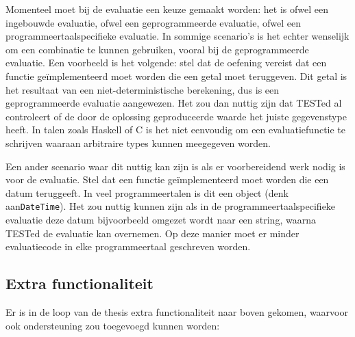 Momenteel moet bij de evaluatie een keuze gemaakt worden: het is ofwel een ingebouwde evaluatie, ofwel een geprogrammeerde evaluatie, ofwel een programmeertaalspecifieke evaluatie.
In sommige scenario's is het echter wenselijk om een combinatie te kunnen gebruiken, vooral bij de geprogrammeerde evaluatie.
Een voorbeeld is het volgende: stel dat de oefening vereist dat een functie geïmplementeerd moet worden die een getal moet teruggeven.
Dit getal is het resultaat van een niet-deterministische berekening, dus is een geprogrammeerde evaluatie aangewezen.
Het zou dan nuttig zijn dat TESTed al controleert of de door de oplossing geproduceerde waarde het juiste gegevenstype heeft.
In talen zoals Haskell of C is het niet eenvoudig om een evaluatiefunctie te schrijven waaraan arbitraire types kunnen meegegeven worden.

Een ander scenario waar dit nuttig kan zijn is als er voorbereidend werk nodig is voor de evaluatie.
Stel dat een functie geïmplementeerd moet worden die een datum teruggeeft.
In veel programmeertalen is dit een object (denk aan\texttt{DateTime}).
Het zou nuttig kunnen zijn als in de programmeertaalspecifieke evaluatie deze datum bijvoorbeeld omgezet wordt naar een string, waarna TESTed de evaluatie kan overnemen.
Op deze manier moet er minder evaluatiecode in elke programmeertaal geschreven worden.


\subsection{Extra functionaliteit}\label{subsec:kleinere-functies}

Er is in de loop van de thesis extra functionaliteit naar boven gekomen, waarvoor ook ondersteuning zou toegevoegd kunnen worden:

